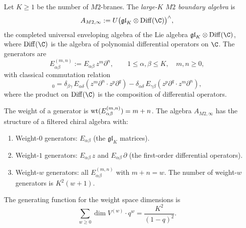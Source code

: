 \begin{definition}
Let $K \ge 1$ be the number of $M2$-branes. The \emph{large-$K$
$M2$ boundary algebra} is
\begin{equation}%
A_{M2,\infty}
:= U\bigl(\mathfrak{gl}_K \otimes \Diff(\C)\bigr)^{\wedge},
\end{equation}
the completed universal enveloping algebra of the Lie algebra
$\mathfrak{gl}_K \otimes \Diff(\C)$, where $\Diff(\C)$ is the
algebra of polynomial differential operators on $\C$. The
generators are
\begin{equation}%
E^{(m,n)}_{\alpha\beta} := E_{\alpha\beta}\, z^m \partial^n,
\qquad
1 \le \alpha, \beta \le K, \quad m, n \ge 0,
\end{equation}
with classical commutation relation
\begin{equation}%
[E^{(m,n)}_{\alpha\beta},\, E^{(p,q)}_{\gamma\delta}]_0
= \delta_{\beta\gamma}\, E_{\alpha\delta}(z^m\partial^n \cdot z^p\partial^q)
- \delta_{\alpha\delta}\, E_{\gamma\beta}(z^p\partial^q \cdot z^m\partial^n),
\end{equation}
where the product on $\Diff(\C)$ is the composition of differential
operators.
\end{definition}

\begin{proposition}
The weight of a generator is
$\operatorname{wt}(E^{(m,n)}_{\alpha\beta}) = m + n$. The algebra $A_{M2,\infty}$
has the structure of a filtered chiral algebra with:
\begin{enumerate}[label=\textup{(\roman*)}]
\item Weight-$0$ generators: $E_{\alpha\beta}$ (the $\mathfrak{gl}_K$
 matrices).
\item Weight-$1$ generators: $E_{\alpha\beta}\,z$ and
 $E_{\alpha\beta}\,\partial$ (the first-order differential operators).
\item Weight-$w$ generators: all $E^{(m,n)}_{\alpha\beta}$ with
 $m + n = w$. The number of weight-$w$ generators is
 $K^2(w+1)$.
\end{enumerate}
The generating function for the weight space dimensions is
\begin{equation}%
\sum_{w \ge 0} \dim V^{(w)} \cdot q^w
= \frac{K^2}{(1-q)^2}.
\end{equation}
\end{proposition}

